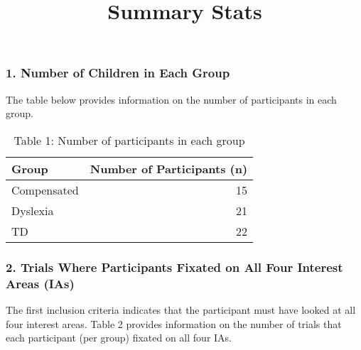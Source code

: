 \documentclass[
]{article}
\title{Summary Stats}
\author{}
\date{\vspace{-2.5em}}
\begin{document}
\maketitle

\subsubsection{1. Number of Children in Each
Group}\label{number-of-children-in-each-group}

The table below provides information on the number of participants in
each group.

\begin{table}[t]
\caption*{
{\large Table 1: Number of participants in each group}
} 
\fontsize{12.0pt}{14.4pt}\selectfont
\begin{tabular*}{\linewidth}{@{\extracolsep{\fill}}lr}
\toprule
Group & Number of Participants (n) \\ 
\midrule\addlinespace[2.5pt]
Compensated & 15 \\ 
Dyslexia & 21 \\ 
TD & 22 \\ 
\bottomrule
\end{tabular*}
\end{table}

\subsubsection{2. Trials Where Participants Fixated on All Four Interest
Areas
(IAs)}\label{trials-where-participants-fixated-on-all-four-interest-areas-ias}

The first inclusion criteria indicates that the participant must have
looked at all four interest areas. Table 2 provides information on the
number of trials that each participant (per group) fixated on all four
IAs.
\end{document}
